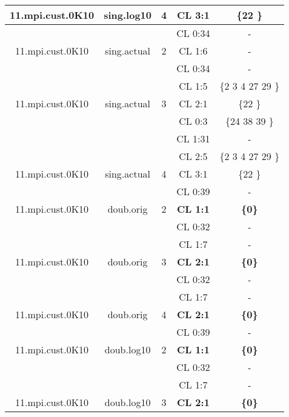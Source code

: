 \begin{table}[t]
{\begin{tabular}{|c|c|c|c|c|}
\multirow{-4}{*}{11.mpi.cust.0K10} & \multirow{-4}{*}{sing.log10} & \multirow{-4}{*}{4} & CL 3:1 & \{22 \} \\ \hline
 &  &  & CL 0:34 & - \\ \cline{4-5} 
\multirow{-2}{*}{11.mpi.cust.0K10} & \multirow{-2}{*}{sing.actual} & \multirow{-2}{*}{2} & CL 1:6 & - \\ \hline
 &  &  & CL 0:34 & - \\ \cline{4-5} 
 &  &  & CL 1:5 & \{2 3 4 27 29 \} \\ \cline{4-5} 
\multirow{-3}{*}{11.mpi.cust.0K10} & \multirow{-3}{*}{sing.actual} & \multirow{-3}{*}{3} & CL 2:1 & \{22 \} \\ \hline
 &  &  & CL 0:3 & \{24 38 39 \} \\ \cline{4-5} 
 &  &  & CL 1:31 & - \\ \cline{4-5} 
 &  &  & CL 2:5 & \{2 3 4 27 29 \} \\ \cline{4-5} 
\multirow{-4}{*}{11.mpi.cust.0K10} & \multirow{-4}{*}{sing.actual} & \multirow{-4}{*}{4} & CL 3:1 & \{22 \} \\ \hline
 &  &  & CL 0:39 & - \\ \cline{4-5} 
\multirow{-2}{*}{11.mpi.cust.0K10} & \multirow{-2}{*}{doub.orig} & \multirow{-2}{*}{2} & \textbf{CL 1:1} & \textbf{\{0\}} \\ \hline
 &  &  & CL 0:32 & - \\ \cline{4-5} 
 &  &  & CL 1:7 & - \\ \cline{4-5} 
\multirow{-3}{*}{11.mpi.cust.0K10} & \multirow{-3}{*}{doub.orig} & \multirow{-3}{*}{3} & \textbf{CL 2:1} & \textbf{\{0\}} \\ \hline
 &  &  & CL 0:32 & - \\ \cline{4-5} 
 &  &  & CL 1:7 & - \\ \cline{4-5} 
\multirow{-3}{*}{11.mpi.cust.0K10} & \multirow{-3}{*}{doub.orig} & \multirow{-3}{*}{4} & \textbf{CL 2:1} & \textbf{\{0\}} \\ \hline
 &  &  & CL 0:39 & - \\ \cline{4-5} 
\multirow{-2}{*}{11.mpi.cust.0K10} & \multirow{-2}{*}{doub.log10} & \multirow{-2}{*}{2} & \textbf{CL 1:1} & \textbf{\{0\}} \\ \hline
 &  &  & CL 0:32 & - \\ \cline{4-5} 
 &  &  & CL 1:7 & - \\ \cline{4-5} 
\multirow{-3}{*}{11.mpi.cust.0K10} & \multirow{-3}{*}{doub.log10} & \multirow{-3}{*}{3} & \textbf{CL 2:1} & \textbf{\{0\}} \\ \hline

\end{tabular}}
\end{table}
